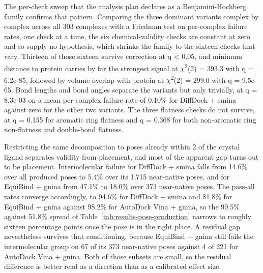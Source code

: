 The per-check sweep that the analysis plan declares as a Benjamini-Hochberg family confirms that pattern. Comparing the three dominant variants complex by complex across all 303 complexes with a Friedman test on per-complex failure rates, one check at a time, the six chemical-validity checks are constant at zero and so supply no hypothesis, which shrinks the family to the sixteen checks that vary. Thirteen of those sixteen survive correction at q \textless{} 0.05, and minimum distance to protein carries by far the strongest signal at \ensuremath{\chi}\textsuperscript{2}(2) = 393.3 with q = 6.2e-85, followed by volume overlap with protein at \ensuremath{\chi}\textsuperscript{2}(2) = 299.0 with q = 9.5e-65. Bond lengths and bond angles separate the variants but only trivially, at q = 8.3e-03 on a mean per-complex failure rate of 0.10\% for DiffDock + smina against zero for the other two variants. The three flatness checks do not survive, at q = 0.155 for aromatic ring flatness and q = 0.368 for both non-aromatic ring non-flatness and double-bond flatness.

Restricting the same decomposition to poses already within 2\angstrom{} of the crystal ligand separates validity from placement, and most of the apparent gap turns out to be placement. Intermolecular failure for DiffDock + smina falls from 14.6\% over all produced poses to 5.4\% over its 1,715 near-native poses, and for EquiBind + gnina from 47.1\% to 18.0\% over 373 near-native poses. The pass-all rates converge accordingly, to 94.6\% for DiffDock + smina and 81.8\% for EquiBind + gnina against 98.2\% for AutoDock Vina + gnina, so the 99.5\% against 51.8\% spread of Table~\ref{tab:results-pose-production} narrows to roughly sixteen percentage points once the pose is in the right place. A residual gap nevertheless survives that conditioning, because EquiBind + gnina still fails the intermolecular group on 67 of its 373 near-native poses against 4 of 221 for AutoDock Vina + gnina. Both of those subsets are small, so the residual difference is better read as a direction than as a calibrated effect size.

